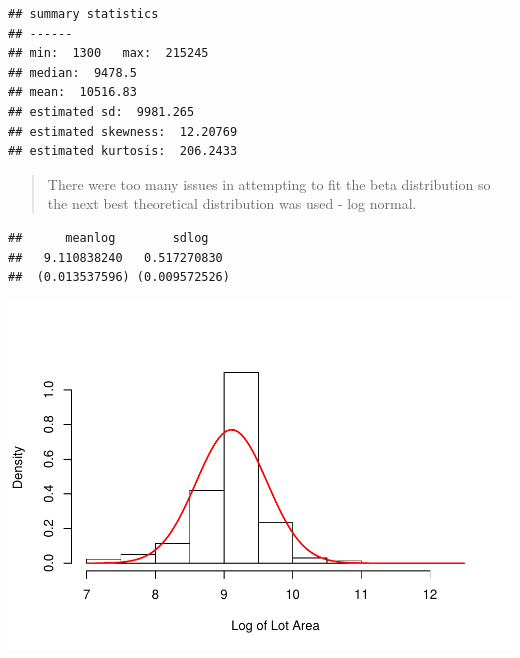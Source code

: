\documentclass[]{article}
\newenvironment{Shaded}{\begin{snugshade}}{\end{snugshade}}
\newcommand{\KeywordTok}[1]{\textcolor[rgb]{0.13,0.29,0.53}{\textbf{{#1}}}}
\newcommand{\DataTypeTok}[1]{\textcolor[rgb]{0.13,0.29,0.53}{{#1}}}
\newcommand{\DecValTok}[1]{\textcolor[rgb]{0.00,0.00,0.81}{{#1}}}
\newcommand{\StringTok}[1]{\textcolor[rgb]{0.31,0.60,0.02}{{#1}}}
\newcommand{\OtherTok}[1]{\textcolor[rgb]{0.56,0.35,0.01}{{#1}}}
\newcommand{\NormalTok}[1]{{#1}}
\begin{document}
\begin{verbatim}
## summary statistics
## ------
## min:  1300   max:  215245 
## median:  9478.5 
## mean:  10516.83 
## estimated sd:  9981.265 
## estimated skewness:  12.20769 
## estimated kurtosis:  206.2433
\end{verbatim}

\begin{quote}
There were too many issues in attempting to fit the beta distribution so
the next best theoretical distribution was used - log normal.
\end{quote}

\begin{Shaded}
\end{Shaded}

\begin{verbatim}
##      meanlog        sdlog   
##   9.110838240   0.517270830 
##  (0.013537596) (0.009572526)
\end{verbatim}

\begin{Shaded}
\end{Shaded}

\includegraphics{Final_Project_files/figure-latex/unnamed-chunk-16-1.pdf}
\end{document}
